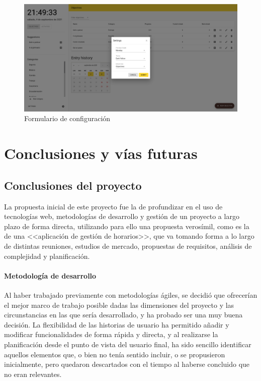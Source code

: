 \documentclass[10pt, a4paper]{aqademic}
\begin{document}
\begin{figure}[hbt!]
	\centering
	\includegraphics[scale=0.25]{img/demo-ajustes-1.png}
	\caption{Formulario de configuración}
\end{figure}

\chapter{Conclusiones y vías futuras}

\section{Conclusiones del proyecto}

La propuesta inicial de este proyecto fue la de profundizar en el uso de tecnologías web, metodologías de desarrollo y gestión de un proyecto a largo plazo
de forma directa, utilizando para ello una propuesta verosímil, como es la de una <<aplicación de gestión de horarios>>, que va tomando forma a lo largo de distintas reuniones, estudios de mercado, propuestas de requisitos, análisis de complejidad y planificación. 


\subsubsection*{Metodología de desarrollo}

Al haber trabajado previamente con metodologías ágiles, se decidió que ofrecerían el mejor marco de trabajo posible dadas las dimensiones del proyecto y las circunstancias en las que sería desarrollado, y ha probado ser una muy buena decisión. La flexibilidad de las historias de usuario ha permitido añadir y modificar funcionalidades de forma rápida y directa, y al realizarse la planificación desde el punto de vista del usuario final, ha sido sencillo identificar aquellos elementos que, o bien no tenía sentido incluir, o se propusieron inicialmente, pero quedaron descartados con el tiempo al haberse concluido que no eran relevantes.
\end{document}
